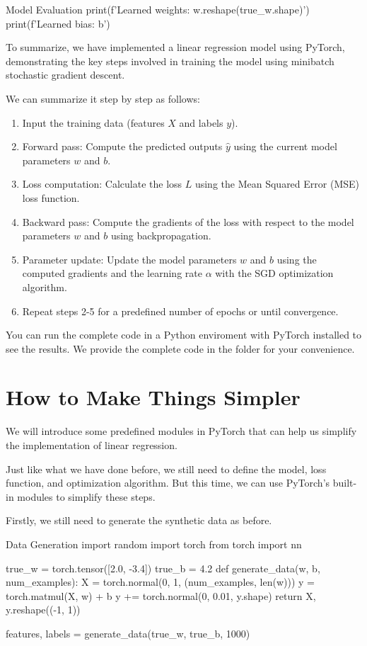 \begin{pythoncode}{Model Evaluation}
print(f'Learned weights: {w.reshape(true_w.shape)}')
print(f'Learned bias: {b}')
\end{pythoncode}

To summarize, we have implemented a linear regression model using PyTorch, demonstrating the key steps involved in training the model using minibatch stochastic gradient descent.

We can summarize it step by step as follows:
\begin{enumerate}
    \item Input the training data (features \(X\) and labels \(y\)).
    \item Forward pass: Compute the predicted outputs \(\hat{y}\) using the current model parameters \(w\) and \(b\).
    \item Loss computation: Calculate the loss \(L\) using the Mean Squared Error (MSE) loss function.
    \item Backward pass: Compute the gradients of the loss with respect to the model parameters \(w\) and \(b\) using backpropagation.
    \item Parameter update: Update the model parameters \(w\) and \(b\) using the computed gradients and the learning rate \(\alpha\) with the SGD optimization algorithm.
    \item Repeat steps 2-5 for a predefined number of epochs or until convergence.
\end{enumerate}

You can run the complete code in a Python enviroment with PyTorch installed to see the results. We provide the complete code in the folder for your convenience.

\section{How to Make Things Simpler}

We will introduce some predefined modules in PyTorch that can help us simplify the implementation of linear regression.

Just like what we have done before, we still need to define the model, loss function, and optimization algorithm. But this time, we can use PyTorch's built-in modules to simplify these steps.

Firstly, we still need to generate the synthetic data as before.

\begin{pythoncode}{Data Generation}
import random
import torch
from torch import nn

true_w = torch.tensor([2.0, -3.4])
true_b = 4.2
def generate_data(w, b, num_examples):
    X = torch.normal(0, 1, (num_examples, len(w)))
    y = torch.matmul(X, w) + b
    y += torch.normal(0, 0.01, y.shape)
    return X, y.reshape((-1, 1))

features, labels = generate_data(true_w, true_b, 1000)
\end{pythoncode}

